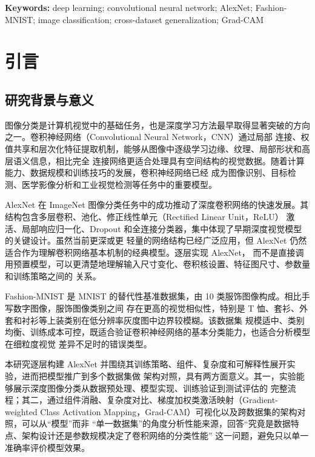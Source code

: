 \documentclass[12pt,a4paper,fontset=fandol]{ctexart}
\numberwithin{figure}{section}
\numberwithin{table}{section}
\numberwithin{equation}{section}
\begin{document}
\par\vspace{1ex}
\noindent\textbf{Keywords:} deep learning; convolutional neural network; AlexNet; Fashion-MNIST; image classification; cross-dataset generalization; Grad-CAM

\newpage
\tableofcontents
\clearpage
{}  %

\section{引言}

\subsection{研究背景与意义}
图像分类是计算机视觉中的基础任务，也是深度学习方法最早取得显著突破的方向之一。卷积神经网络（Convolutional Neural Network，CNN）通过局部
连接、权值共享和层次化特征提取机制，能够从图像中逐级学习边缘、纹理、局部形状和高层语义信息，相比完全
连接网络更适合处理具有空间结构的视觉数据。随着计算能力、数据规模和训练技巧的发展，卷积神经网络已经
成为图像识别、目标检测、医学影像分析和工业视觉检测等任务中的重要模型。

AlexNet 在 ImageNet 图像分类任务中的成功推动了深度卷积网络的快速发展。其结构包含多层卷积、池化、修正线性单元（Rectified Linear Unit，ReLU）
激活、局部响应归一化、Dropout 和全连接分类器，集中体现了早期深度视觉模型的关键设计。虽然当前更深或更
轻量的网络结构已经广泛应用，但 AlexNet 仍然适合作为理解卷积网络基本机制的经典模型。逐层实现 AlexNet，
而不是直接调用预置模型，可以更清楚地理解输入尺寸变化、卷积核设置、特征图尺寸、参数量和训练策略之间的
关系。

Fashion-MNIST 是 MNIST 的替代性基准数据集，由 10 类服饰图像构成。相比手写数字图像，服饰图像类别之间
存在更高的视觉相似性，特别是 T 恤、套衫、外套和衬衫等上装类别在低分辨率灰度图中边界较模糊。该数据集
规模适中、类别均衡、训练成本可控，既适合验证卷积神经网络的基本分类能力，也适合分析模型在细粒度视觉
差异不足时的错误类型。

本研究逐层构建 AlexNet 并围绕其训练策略、组件、复杂度和可解释性展开实验，进而把模型推广到多个数据集做
架构对照，具有两方面意义。其一，实验能够展示深度图像分类从数据预处理、模型实现、训练验证到测试评估的
完整流程；其二，通过组件消融、复杂度对比、梯度加权类激活映射（Gradient-weighted Class Activation Mapping，Grad-CAM）可视化以及跨数据集的架构对照，可以从“模型”而非
“单一数据集”的角度分析性能来源，回答“究竟是数据特点、架构设计还是参数规模决定了卷积网络的分类性能”
这一问题，避免只以单一准确率评价模型效果。
\end{document}

